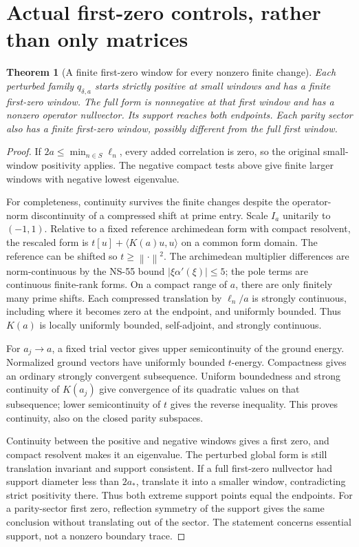 \documentclass[11pt]{article}
\newtheorem{theorem}{Theorem}
\newcommand{\norm}[1]{\left\|#1\right\|}
\begin{document}
\section{Actual first-zero controls, rather than only matrices}
\begin{theorem}[A finite first-zero window for every nonzero finite change]
Each perturbed family $q_{\delta,a}$ starts strictly positive at small
windows and has a finite first-zero window. The full form is nonnegative
at that first window and has a nonzero operator nullvector. Its support
reaches both endpoints. Each parity sector also has a finite first-zero
window, possibly different from the full first window.
\end{theorem}
\begin{proof}
If $2a\le\min_{n\in S}\ell_n$, every added correlation is zero, so the
original small-window positivity applies. The negative compact tests
above give finite larger windows with negative lowest eigenvalue.

For completeness, continuity survives the finite changes despite the
operator-norm discontinuity of a compressed shift at prime entry.
Scale $I_a$ unitarily to $(-1,1)$. Relative to a fixed reference
archimedean form with compact resolvent, the rescaled form is
$t[u]+\langle K(a)u,u\rangle$ on a common form domain.
The reference can be shifted so $t\ge\norm{\cdot}^2$.
The archimedean multiplier differences are norm-continuous by the
NS-55 bound $|\xi\alpha'(\xi)|\le5$; the pole terms are continuous
finite-rank forms. On a compact range of $a$, there are only finitely
many prime shifts. Each compressed translation by $\ell_n/a$ is
strongly continuous, including where it becomes zero at the endpoint,
and uniformly bounded. Thus $K(a)$ is locally uniformly bounded,
self-adjoint, and strongly continuous.

For $a_j\to a$, a fixed trial vector gives upper semicontinuity of
the ground energy. Normalized ground vectors have uniformly bounded
$t$-energy. Compactness gives an ordinary strongly convergent
subsequence. Uniform boundedness and strong continuity of $K(a_j)$
give convergence of its quadratic values on that subsequence; lower
semicontinuity of $t$ gives the reverse inequality. This proves
continuity, also on the closed parity subspaces.

Continuity between the positive and negative windows gives a first
zero, and compact resolvent makes it an eigenvalue. The perturbed
global form is still translation invariant and support consistent.
If a full first-zero nullvector had support diameter less than $2a_*$,
translate it into a smaller window, contradicting strict positivity
there. Thus both extreme support points equal the endpoints.
For a parity-sector first zero, reflection symmetry of the support
gives the same conclusion without translating out of the sector.
The statement concerns essential support, not a nonzero boundary trace.
\end{proof}
\end{document}
